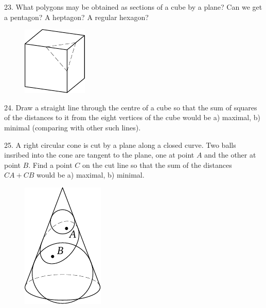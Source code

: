 \begin{problem}{23.}
	What polygons may be obtained as sections of a cube by a plane? Can we get a pentagon? A heptagon?
	A regular hexagon?
	\begin{figure}[h]
	\centering
	\footnotesize
	\includegraphics[scale=1]{taskbook-7}
	\end{figure}
\end{problem}

\begin{problem}{24.}
	Draw a straight line through the centre of a cube so that the sum of squares of the distances to it
	from the eight vertices of the cube would be
	a) maximal,
	b) minimal (comparing with other such lines).
\end{problem}

\begin{problem}{25.}
	A right circular cone is cut by a plane along a closed curve. Two balls insribed into the cone
	are tangent to the plane, one at point $A$ and the other at point $B$. Find a point $C$ on the cut line so
	that the sum of the distances $CA + CB$ would be a) maximal, b) minimal.
	\begin{figure}[h]
	\centering
	\footnotesize
	\includegraphics[scale=1]{taskbook-9}
	\end{figure}
\end{problem}

